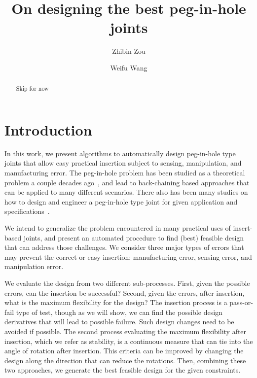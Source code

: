 \documentclass[letterpaper, 10 pt, conference]{ieeeconf}
\title{On designing the best peg-in-hole joints}
\author{Zhibin Zou \and Weifu Wang}
\date{}
\begin{document}
\maketitle


\begin{abstract}
Skip for now
\end{abstract}

\section{Introduction}


In this work, we present algorithms to automatically design peg-in-hole type joints that allow easy practical insertion subject to sensing, manipulation, and manufacturing error. The peg-in-hole problem has been studied as a theoretical problem a couple decades ago~\cite{}, and lead to back-chaining based approaches that can be applied to many different scenarios. There also has been many studies on how to design and engineer a peg-in-hole type joint for given application and specifications~\cite{}. 

We intend to generalize the problem encountered in many practical uses of insert-based joints, and present an automated procedure to find (best) feasible design that can address those challenges. We consider three major types of errors that may prevent the correct or easy insertion: manufacturing error, sensing error, and manipulation error. 

We evaluate the design from two different sub-processes. First, given the possible errors, can the insertion be successful? Second, given the errors, after insertion, what is the maximum flexibility for the design? The insertion process is a pass-or-fail type of test, though as we will show, we can find the possible design derivatives that will lead to possible failure. Such design changes need to be avoided if possible. The second process evaluating the maximum flexibility after insertion, which we refer as stability, is a continuous measure that can tie into the angle of rotation after insertion. This criteria can be improved by changing the design along the direction that can reduce the rotations. Then, combining these two approaches, we generate the best feasible design for the given constraints. 
\end{document}
